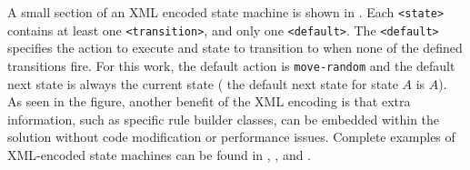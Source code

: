A small section of an XML encoded state machine is shown in .  Each \texttt{<state>} contains at least one \texttt{<transition>}, and only one \texttt{<default>}.  The \texttt{<default>} specifies the action to execute and state to transition to when none of the defined transitions fire.  For this work, the default action is \texttt{move-random} and the default next state is always the current state (\eg{} the default next state for state $A$ is $A$).  As seen in the figure, another benefit of the XML encoding is that extra information, such as specific rule builder classes, can be embedded within the solution without code modification or performance issues.  Complete examples of XML-encoded state machines can be found in , , and .

